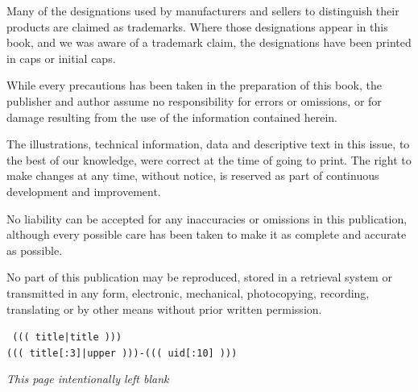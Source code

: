 \documentclass{article}
\begin{document}
\vfill

\noindent
\scriptsize{Many of the designations used by manufacturers and sellers
  to distinguish their products are claimed as trademarks. Where those
  designations appear in this book, and we was aware of a trademark
  claim, the designations have been printed in caps or initial caps.}

\vspace{10pt}

\noindent
\scriptsize{While every precautions has been taken in the preparation of
  this book, the publisher and author assume no responsibility for
  errors or omissions, or for damage resulting from the use of the
  information contained herein.}

\vspace{10pt}

\noindent
\scriptsize{The illustrations, technical information, data and
  descriptive text in this issue, to the best of our knowledge, were
  correct at the time of going to print. The right to make changes at
  any time, without notice, is reserved as part of continuous
  development and improvement.
}

\vspace{10pt}

\noindent
\scriptsize{No liability can be accepted for any inaccuracies or
  omissions in this publication, although every possible care has been
  taken to make it as complete and accurate as possible.}

\vspace{10pt}

\noindent
\scriptsize{No part of this publication may be reproduced, stored in a
  retrieval system or transmitted in any form, electronic, mechanical,
  photocopying, recording, translating or by other means without prior
  written permission.}

\vspace{15pt}

\begin{flushright}
\scriptsize{
  \texttt{ ((( title|title ))) \\ ((( title[:3]|upper )))-((( uid[:10] ))) }
}
\end{flushright}



\clearpage

\noindent
\begin{center}
{\normalsize \emph{This page intentionally left blank}}
\end{center}
\end{document}
